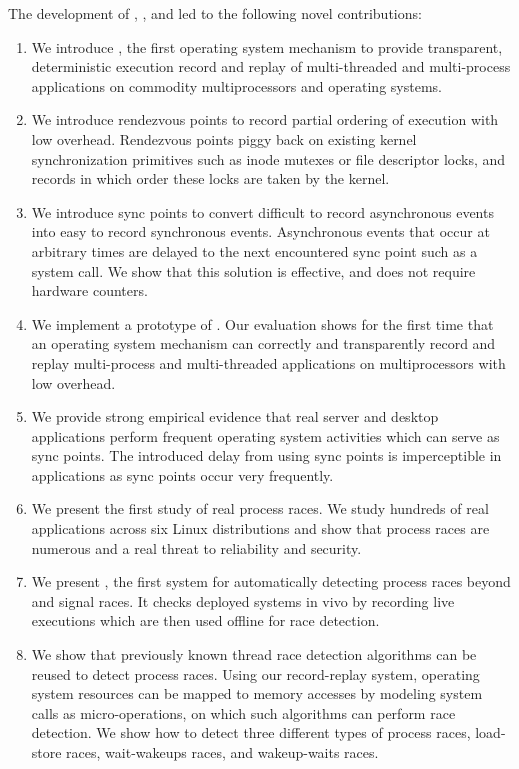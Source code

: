 The development of \scribe, \racepro, \dora and \synapse led to the following
novel contributions:
\begin{enumerate}

\item We introduce \scribe, the first operating system mechanism to provide
transparent, deterministic execution record and replay of multi-threaded and
multi-process applications on commodity multiprocessors and operating
systems.

\item We introduce rendezvous points to record partial ordering of
execution with low overhead. Rendezvous points piggy back on existing kernel
synchronization primitives such as inode mutexes or file descriptor locks,
and records in which order these locks are taken by the kernel.

\item We introduce sync points to convert difficult to record asynchronous
events into easy to record synchronous events. Asynchronous events that
occur at arbitrary times are delayed to the next encountered sync point
such as a system call. We show that this solution is effective, and does
not require hardware counters.

\item We implement a prototype of \scribe. Our evaluation shows for the first
time that an operating system mechanism can correctly and transparently record
and replay multi-process and multi-threaded applications on multiprocessors
with low overhead.

\item We provide strong empirical evidence that real server and desktop
applications perform frequent operating system activities which can serve as
sync points. The introduced delay from using sync points is imperceptible in
applications as sync points occur very frequently.

\item We present the first study of real process races. We study hundreds of
real applications across six Linux distributions and show that process races
are numerous and a real threat to reliability and security.

\item We present \racepro, the first system for automatically detecting
process races beyond \toctou and signal races. It checks deployed systems in
vivo by recording live executions which are then used offline for race detection.

\item We show that previously known thread race detection algorithms can be
reused to detect process races. Using our record-replay system, operating
system resources can be mapped to memory accesses by modeling system calls
as micro-operations, on which such algorithms can perform race detection.
We show how to detect three different types of process races, load-store races,
wait-wakeups races, and wakeup-waits races.


\end{enumerate}

